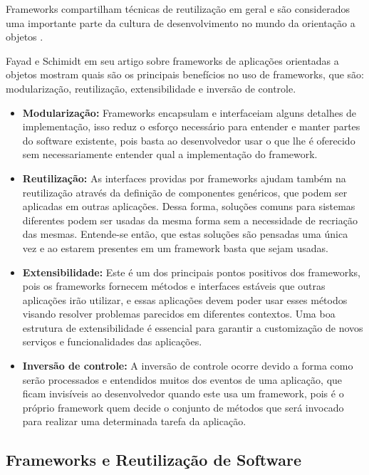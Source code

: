Frameworks compartilham técnicas de reutilização em geral e são considerados uma importante parte da cultura de desenvolvimento no mundo da orientação a objetos \cite{Johnson:1997}.

Fayad e Schimidt em seu artigo \cite{Fayad:Schimidt:1997} sobre frameworks de aplicações orientadas a objetos mostram quais são os principais benefícios no uso de frameworks, que são: modularização, reutilização, extensibilidade e inversão de controle.

\begin{itemize}
	\item \textbf{Modularização:} Frameworks encapsulam e interfaceiam alguns detalhes de implementação, isso reduz o esforço necessário para entender e manter partes do software existente, pois basta ao desenvolvedor usar o que lhe é oferecido sem necessariamente entender qual a implementação do framework.

	\item \textbf{Reutilização:} As interfaces providas por frameworks ajudam também na reutilização através da definição de componentes genéricos, que podem ser aplicadas em outras aplicações. Dessa forma, soluções comuns para sistemas diferentes podem ser usadas da mesma forma sem a necessidade de recriação das mesmas. Entende-se então, que estas soluções são pensadas uma única vez e ao estarem presentes em um framework basta que sejam usadas.

	\item \textbf{Extensibilidade:} Este é um dos principais pontos positivos dos frameworks, pois os frameworks fornecem métodos e interfaces estáveis que outras aplicações irão utilizar, e essas aplicações devem poder usar esses métodos visando resolver problemas parecidos em diferentes contextos. Uma boa estrutura de extensibilidade é essencial para garantir a customização de novos serviços e funcionalidades das aplicações.

	\item \textbf{Inversão de controle:} A inversão de controle ocorre devido a forma como serão processados e entendidos muitos dos eventos de uma aplicação, que ficam invisíveis ao desenvolvedor quando este usa um framework, pois é o próprio framework quem decide o conjunto de métodos que será invocado para realizar uma determinada tarefa da aplicação.
\end{itemize}

\subsection{Frameworks e Reutilização de Software}

